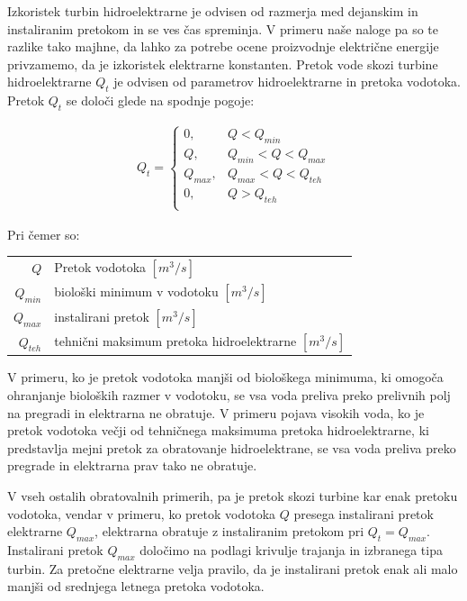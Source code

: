 Izkoristek turbin hidroelektrarne je odvisen od razmerja med dejanskim in instaliranim pretokom in se ves čas spreminja. V primeru naše naloge pa so te razlike tako majhne, da lahko za potrebe ocene proizvodnje električne energije privzamemo, da je izkoristek elektrarne konstanten. Pretok vode skozi turbine hidroelektrarne $Q_t$ je odvisen od parametrov hidroelektrarne in pretoka vodotoka. Pretok $Q_t$ se določi glede na spodnje pogoje:

\begin{ceqn}
	\begin{align}
	Q_t = \begin{cases}
	0, &Q < Q_{min}\\
	Q, &Q_{min} < Q < Q_{max}\\
	Q_{max}, &Q_{max}< Q < Q_{teh}\\
	0, &Q > Q_{teh}\\
	\end{cases}
	\end{align}
\end{ceqn}

Pri čemer so:
\begin{table}[htb!]
	\begin{tabular}{r|p{10cm}}
		$Q$ & Pretok vodotoka $\left[m^3/s \right]$\\
		$Q_{min}$ & biološki minimum v vodotoku $\left[m^3/s \right]$ \\
		$Q_{max}$ & instalirani pretok $\left[m^3/s \right]$ \\
		$Q_{teh}$ & tehnični maksimum pretoka hidroelektrarne $\left[m^3/s \right]$ \\
	\end{tabular}
\end{table}


V primeru, ko je pretok vodotoka manjši od biološkega minimuma, ki omogoča ohranjanje bioloških razmer v vodotoku, se vsa voda preliva preko prelivnih polj na pregradi in elektrarna ne obratuje. V primeru pojava visokih voda, ko je pretok vodotoka večji od tehničnega maksimuma pretoka hidroelektrarne, ki predstavlja mejni pretok za obratovanje hidroelektrane, se vsa voda preliva preko pregrade in elektrarna prav tako ne obratuje. 

V vseh ostalih obratovalnih primerih, pa je pretok skozi turbine kar enak pretoku vodotoka, vendar v primeru, ko pretok vodotoka $Q$ presega instalirani pretok elektrarne $Q_{max}$, elektrarna obratuje z instaliranim pretokom pri $Q_t = Q_{max}$. Instalirani pretok $Q_{max}$ določimo na podlagi krivulje trajanja in izbranega tipa turbin. Za pretočne elektrarne velja pravilo, da je instalirani pretok enak ali malo manjši od srednjega letnega pretoka vodotoka. 



